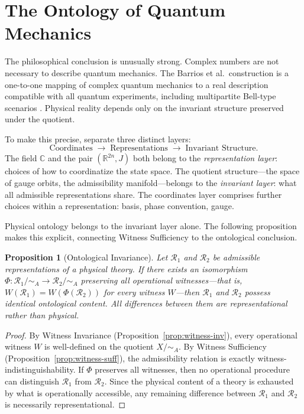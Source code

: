 \documentclass[12pt]{article}
\newtheorem{proposition}[theorem]{Proposition}
\begin{document}
\section{The Ontology of Quantum Mechanics}

The philosophical conclusion is unusually strong. Complex numbers are not necessary to describe quantum mechanics. The Barrios et al.\ construction is a one-to-one mapping of complex quantum mechanics to a real description compatible with all quantum experiments, including multipartite Bell-type scenarios \cite{Barrios}. Physical reality depends only on the invariant structure preserved under the quotient.

To make this precise, separate three distinct layers:
\[
\text{Coordinates}
\;\longrightarrow\;
\text{Representations}
\;\longrightarrow\;
\text{Invariant Structure.}
\]
The field $\mathbb{C}$ and the pair $(\mathbb{R}^{2n}, J)$ both belong to the \emph{representation layer}: choices of how to coordinatize the state space. The quotient structure---the space of gauge orbits, the admissibility manifold---belongs to the \emph{invariant layer}: what all admissible representations share. The coordinates layer comprises further choices within a representation: basis, phase convention, gauge.

Physical ontology belongs to the invariant layer alone. The following proposition makes this explicit, connecting Witness Sufficiency to the ontological conclusion.

\begin{proposition}[Ontological Invariance]
\label{prop:ont-inv}
Let $\mathcal{R}_1$ and $\mathcal{R}_2$ be admissible representations of a physical theory. If there exists an isomorphism $\Phi\colon \mathcal{R}_1/{\sim_A} \to \mathcal{R}_2/{\sim_A}$ preserving all operational witnesses---that is, $W(\mathcal{R}_1) = W(\Phi(\mathcal{R}_2))$ for every witness $W$---then $\mathcal{R}_1$ and $\mathcal{R}_2$ possess identical ontological content. All differences between them are representational rather than physical.
\end{proposition}

\begin{proof}
By Witness Invariance (Proposition~\ref{prop:witness-inv}), every operational witness $W$ is well-defined on the quotient $X/{\sim_A}$. By Witness Sufficiency (Proposition~\ref{prop:witness-suff}), the admissibility relation is exactly witness-indistinguishability. If $\Phi$ preserves all witnesses, then no operational procedure can distinguish $\mathcal{R}_1$ from $\mathcal{R}_2$. Since the physical content of a theory is exhausted by what is operationally accessible, any remaining difference between $\mathcal{R}_1$ and $\mathcal{R}_2$ is necessarily representational.
\end{proof}
\end{document}
